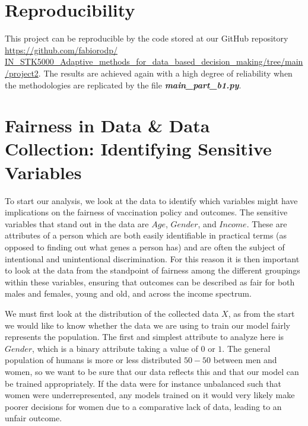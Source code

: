 \documentclass{article}
\begin{document}
\section{Reproducibility}
\label{chap:Reproducibility}

This project can be reproducible by the code stored at our GitHub repository \href{https://github.com/fabiorodp/IN_STK5000_Adaptive_methods_for_data_based_decision_making/tree/main/project2}{https://github.com/fabiorodp/ IN\_STK5000\_Adaptive\_methods\_for\_data\_based\_decision\_making/tree/main/project2}. The results are achieved again with a high degree of reliability when the methodologies are replicated by the file \textbf{\textit{main\_part\_b1.py}}.

\section{Fairness in Data \& Data Collection: Identifying Sensitive Variables}
\graphicspath{{pictures}}
To start our analysis, we look at the data to identify which variables might have implications on the fairness of vaccination policy and outcomes. The sensitive variables that stand out in the data are $Age$, $Gender$, and $Income$. These are attributes of a person which are both easily identifiable in practical terms (as opposed to finding out what genes a person has) and are often the subject of intentional and unintentional discrimination. For this reason it is then important to look at the data from the standpoint of fairness among the different groupings within these variables, ensuring that outcomes can be described as fair for both males and females, young and old, and across the income spectrum. 

We must first look at the distribution of the collected data $X$, as from the start we would like to know whether the data we are using to train our model fairly represents the population. The first and simplest attribute to analyze here is $Gender$, which is a binary attribute taking a value of $0$ or $1$. The general population of humans is more or less distributed $50-50$ between men and women, so we want to be sure that our data reflects this and that our model can be trained appropriately. If the data were for instance unbalanced such that women were underrepresented, any models trained on it would very likely make poorer decisions for women due to a comparative lack of data, leading to an unfair outcome.
\end{document}
